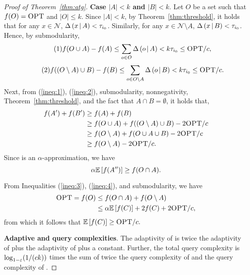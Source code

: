 \begin{proof}[Proof of Theorem~\ref{thm:atg}]
  \textbf{Case $|A| < k$ and $|B| < k$}.
  Let $O$ be a set such that $f(O) = \textsc{OPT}$ 
  and $|O| \le k$. 
  Since $|A| < k$, by Theorem~\ref{thm:threshold},
  it holds that for any $x \in \mathcal N$,
  $\Delta \left( x \, | \, A \right) < \tau_{i_0}$. 
  Similarly, for any $x \in \mathcal N \setminus A$,
  $\Delta \left( x \, | \, B \right) < \tau_{i_0}$. 
  Hence, by submodularity,
  \begin{equation}
    \numberthis
    \label{ineq:1}
    f(O \cup A) - f(A) \le \sum_{o \in O} \marge{o}{A}
    < k \tau_{i_0} \nonumber \le \opt / c, 
  \end{equation}
  \begin{equation} 
    \numberthis{}
    \label{ineq:2}
    f( (O \setminus A) \cup B ) - f(B) 
    \le \sum_{o \in O \setminus A} \marge{o}{B} < 
    k \tau_{i_0} \nonumber \le \opt / c. 
  \end{equation}
  Next, from (\ref{ineq:1}), (\ref{ineq:2}), submodularity, nonnegativity, 
  Theorem~\ref{thm:threshold}, and the fact that $A \cap B = \emptyset$, 
  it holds that,
  \begin{align} \label{ineq:3}
    f(A') + f(B') &\ge f(A) + f(B) \nonumber \\ 
    &\ge f(O \cup A) + f( (O \setminus A) \cup B ) - 2\textsc{OPT}/c \nonumber \\ 
    &\ge f(O \setminus A) + f( O \cup A \cup B)- 2\textsc{OPT}/c \nonumber \\ 
    &\ge f( O \setminus A )- 2\textsc{OPT}/c.
  \end{align}
Since \unc is an $\alpha$-approximation, we have
\begin{equation} \label{ineq:4}
  \alpha \mathbb{E} \left[ f(A'') \right] \ge f( O \cap A ).
\end{equation}
  
From Inequalities (\ref{ineq:3}), (\ref{ineq:4}),
and submodularity,
  we have
  \begin{align*} 
    \textsc{OPT} = f(O) &\le f( O \cap A ) + f( O \setminus A ) \\ 
    &\le \alpha \mathbb{E} \left[ f(C) \right] + 2f(C) + 2\textsc{OPT} / c,
  \end{align*}
  from which it follows that
  $\mathbb{E} \left[  f(C)  \right] \ge \textsc{OPT} / c.$

  \textbf{Adaptive and query complexities}.
  The adaptivity of \atg is twice the adaptivity of \threseq
  plus the adaptivity of \unc plus a constant. 
  Further, the total query complexity is $\log_{1 - \varepsilon}(1/(ck))$ times
  the sum of twice the query complexity of \threseq and the query complexity
  of \unc.
\end{proof}

